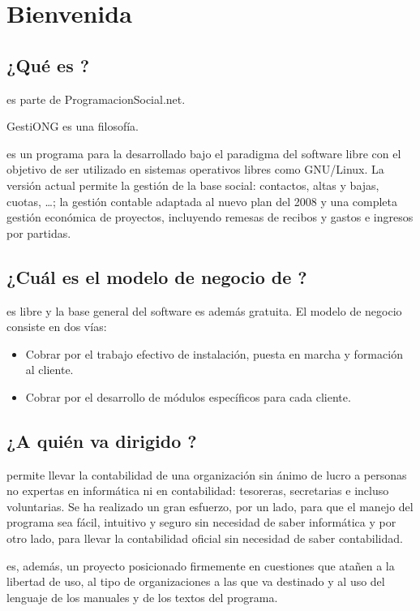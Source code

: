 \chapter{Bienvenida}
\section{¿Qué es \appname?}

\appname es parte de ProgramacionSocial.net.


GestiONG es una filosofía.


\appname es un programa para la \appdescription desarrollado bajo el paradigma del
software libre con el objetivo de ser utilizado en sistemas operativos
libres como GNU/Linux. La versión actual permite la gestión de la
base social: contactos, altas y bajas, cuotas, \ldots; la gestión
contable adaptada al nuevo plan del 2008 y una completa gestión
económica de proyectos, incluyendo remesas de recibos y gastos e
ingresos por partidas.

\section{¿Cuál es el modelo de negocio de \appname?}

\appname es libre y la base general del software es además gratuita. 
El modelo de negocio consiste en dos vías:
\begin{itemize}
 \item Cobrar por el trabajo efectivo de instalación, puesta en marcha y formación al cliente.
 \item Cobrar por el desarrollo de módulos específicos para cada cliente.
\end{itemize}


\section{¿A quién va dirigido \appname?}
\appname permite llevar la contabilidad de una organización sin
ánimo de lucro a personas no expertas en informática ni en
contabilidad: tesoreras, secretarias e incluso voluntarias. Se ha
realizado un gran esfuerzo, por un lado, para que el manejo del
programa sea fácil, intuitivo y seguro sin necesidad de saber
informática y por otro lado, para llevar la contabilidad oficial sin
necesidad de saber contabilidad.

\appname es, además, un proyecto posicionado firmemente en cuestiones
que atañen a la libertad de uso, al tipo de organizaciones a las que
va destinado y al uso del lenguaje de los manuales y de los textos del
programa.

